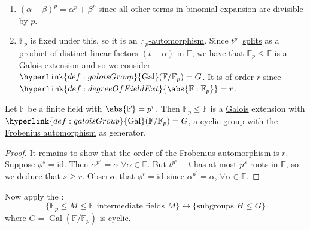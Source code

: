 \documentclass{article}
\DeclareMathOperator{\Gal}{Gal}
\newcommand{\F}{\mathbb{F}}
\begin{document}

\begin{remark}\leavevmode
    \begin{enumerate}[label=(\roman*)]
        \item $(\alpha+\beta)^p = \alpha^p + \beta^p$ since all other terms in binomial expansion are divisible by $p$.
        \item $\F_p$ is fixed under this, so it is an \hyperlink{def:homo}{$\F_p$-automorphism}.
    Since $t^{p^r}$ \hyperlink{def:splitting}{splits} as a product of distinct linear factors $(t-\alpha)$ in $\F$, we have that $\F_p \leq \F$ is a \hyperlink{def:galoisExt}{Galois extension} and so we consider $\hyperlink{def:galoisGroup}{\Gal}(\F/\F_p) = G$.
    It is of order $r$ since $\hyperlink{def:degreeOfFieldExt}{\abs{\F:\F_p}}=r$.
    \end{enumerate}
\end{remark}

\begin{nthm}\label{thm:3.16}
    Let $\F$ be a finite field with $\abs{\F} = p^r$.
    Then $\F_p \leq \F$ is a \hyperlink{def:galoisExt}{Galois} extension with $\hyperlink{def:galoisGroup}{\Gal}(\F/\F_p) = G$, a cyclic group with the \hyperlink{def:frob}{Frobenius automorphism} as generator.
\end{nthm}

\begin{proof}
    It remains to show that the order of the \hyperlink{def:frob}{Frobenius automorphism} is $r$.
    Suppose $\phi^s = \mathrm{id}$.
    Then $\alpha^{p^s} = \alpha \; \forall \alpha \in \F$.
    But $t^{p^s} - t$ has at most $p^s$ roots in $\F$, so we deduce that $s \geq r$.
    Observe that $\phi^r = \mathrm{id}$ since $\alpha^{p^r} = \alpha$, $\forall \alpha \in \F$.
\end{proof}

Now apply the :
\begin{equation*}
    \{\F_p \leq M \leq \F \text{ intermediate fields } M\} \longleftrightarrow \{\text{subgroups } H \leq G\}
\end{equation*}
where $G = \Gal(\F/\F_p)$ is cyclic.
\end{document}
